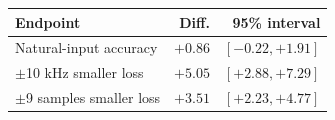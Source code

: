 \begin{tabular}{lrr}
\toprule Endpoint & Diff. & 95\% interval\\
\midrule
Natural-input accuracy & $+0.86$ & $[-0.22, +1.91]$\\
$\pm$10 kHz smaller loss & $+5.05$ & $[+2.88, +7.29]$\\
$\pm$9 samples smaller loss & $+3.51$ & $[+2.23, +4.77]$\\
\bottomrule
\end{tabular}
